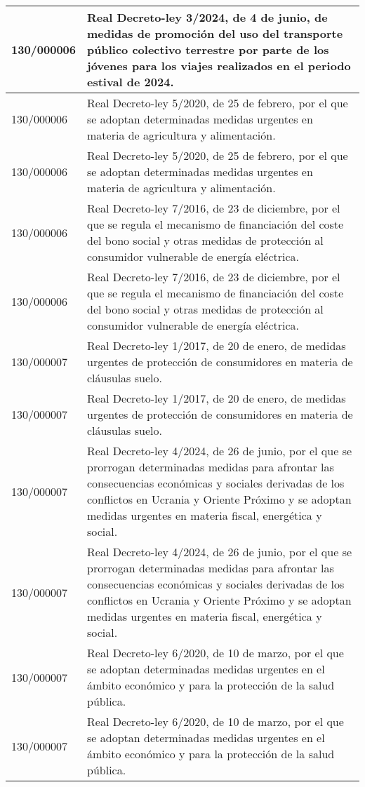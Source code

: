 {\begin{table}[H]
\begin{center}
\begin{tabularx}{\linewidth}{| l | X |}
\hline
130/000006 & Real Decreto-ley 3/2024, de 4 de junio, de medidas de promoción del uso del transporte público colectivo terrestre por parte de los jóvenes para los viajes realizados en el periodo estival de 2024. \\
\hline
130/000006 & Real Decreto-ley 5/2020, de 25 de febrero, por el que se adoptan determinadas medidas urgentes en materia de agricultura y alimentación. \\
\hline
130/000006 & Real Decreto-ley 5/2020, de 25 de febrero, por el que se adoptan determinadas medidas urgentes en materia de agricultura y alimentación. \\
\hline
130/000006 & Real Decreto-ley 7/2016, de 23 de diciembre, por el que se regula el mecanismo de financiación del coste del bono social y otras medidas de protección al consumidor vulnerable de energía eléctrica. \\
\hline
130/000006 & Real Decreto-ley 7/2016, de 23 de diciembre, por el que se regula el mecanismo de financiación del coste del bono social y otras medidas de protección al consumidor vulnerable de energía eléctrica. \\
\hline
130/000007 & Real Decreto-ley 1/2017, de 20 de enero, de medidas urgentes de protección de consumidores en materia de cláusulas suelo. \\
\hline
130/000007 & Real Decreto-ley 1/2017, de 20 de enero, de medidas urgentes de protección de consumidores en materia de cláusulas suelo. \\
\hline
130/000007 & Real Decreto-ley 4/2024, de 26 de junio, por el que se prorrogan determinadas medidas para afrontar las consecuencias económicas y sociales derivadas de los conflictos en Ucrania y Oriente Próximo y se adoptan medidas urgentes en materia fiscal, energética y social. \\
\hline
130/000007 & Real Decreto-ley 4/2024, de 26 de junio, por el que se prorrogan determinadas medidas para afrontar las consecuencias económicas y sociales derivadas de los conflictos en Ucrania y Oriente Próximo y se adoptan medidas urgentes en materia fiscal, energética y social. \\
\hline
130/000007 & Real Decreto-ley 6/2020, de 10 de marzo, por el que se adoptan determinadas medidas urgentes en el ámbito económico y para la protección de la salud pública. \\
\hline
130/000007 & Real Decreto-ley 6/2020, de 10 de marzo, por el que se adoptan determinadas medidas urgentes en el ámbito económico y para la protección de la salud pública. \\

\end{tabularx}
\end{center}
\end{table}}
